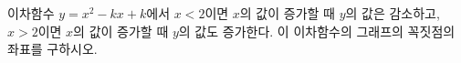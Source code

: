 \hspace*{2mm}\begin{minipage}[t]{\dimexpr\linewidth-2mm\relax}\vspace{0pt}
이차함수 $y=x^2-kx+k$에서 $x<2$이면 $x$의 값이 증가할 때 $y$의 값은 감소하고, $x>2$이면 $x$의 값이 증가할 때 $y$의 값도 증가한다. 이 이차함수의 그래프의 꼭짓점의 좌표를 구하시오. \end{minipage}
